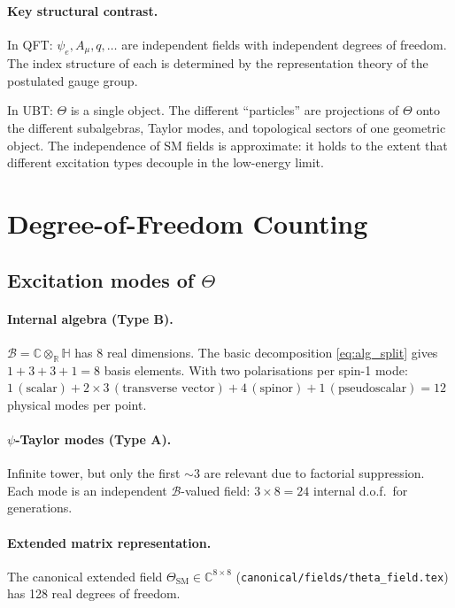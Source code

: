 \documentclass[12pt,a4paper]{article}
\theoremstyle{remark}
\newcommand{\B}{\mathcal{B}}
\newcommand{\C}{\mathbb{C}}
\newcommand{\R}{\mathbb{R}}
\newcommand{\H}{\mathbb{H}}
\begin{document}
\paragraph{Key structural contrast.}
In QFT: $\psi_e, A_\mu, q, \ldots$ are independent fields with independent
degrees of freedom.  The index structure of each is determined by the
representation theory of the postulated gauge group.

In UBT: $\Theta$ is a single object.  The different ``particles'' are
projections of $\Theta$ onto the different subalgebras, Taylor modes, and
topological sectors of one geometric object.  The independence of SM fields
is approximate: it holds to the extent that different excitation types
decouple in the low-energy limit.

\section{Degree-of-Freedom Counting}
\label{sec:dof}

\subsection{Excitation modes of $\Theta$}

\paragraph{Internal algebra (Type B).}
$\B = \C\otimes_\R\H$ has 8 real dimensions.  The basic decomposition
\eqref{eq:alg_split} gives $1+3+3+1 = 8$ basis elements.  With two
polarisations per spin-1 mode: $1\,(\text{scalar}) + 2\times 3\,
(\text{transverse vector}) + 4\,(\text{spinor}) + 1\,
(\text{pseudoscalar}) = 12$ physical modes per point.

\paragraph{$\psi$-Taylor modes (Type A).}
Infinite tower, but only the first $\sim 3$ are relevant due to factorial
suppression.  Each mode is an independent $\B$-valued field: $3\times 8 = 24$
internal d.o.f.\ for generations.

\paragraph{Extended matrix representation.}
The canonical extended field
$\Theta_{\mathrm{SM}}\in\C^{8\times 8}$ (\texttt{canonical/fields/theta\_field.tex})
has 128 real degrees of freedom.
\end{document}
